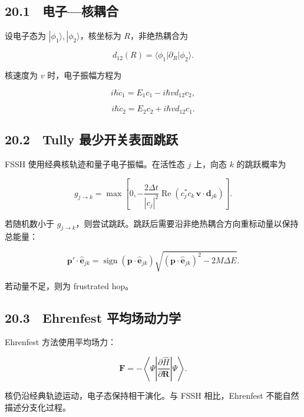 \documentclass[
  a4paper,
]{ctexbook}
\begin{document}
\hypertarget{ux7535ux5b50ux6838ux8026ux5408}{%
\subsection{20.1　电子---核耦合}\label{ux7535ux5b50ux6838ux8026ux5408}}

设电子态为 \(|\phi_1\rangle,|\phi_2\rangle\)，核坐标为
\(R\)，非绝热耦合为

\[
d_{12}(R)
=
\langle\phi_1|\partial_R|\phi_2\rangle.
\]

核速度为 \(v\) 时，电子振幅方程为

\[
i\hbar\dot c_1
=
E_1c_1
-
i\hbar v d_{12}c_2,
\]

\[
i\hbar\dot c_2
=
E_2c_2
+
i\hbar v d_{12}c_1.
\]

\hypertarget{tully-ux6700ux5c11ux5f00ux5173ux8868ux9762ux8df3ux8dc3}{%
\subsection{20.2　Tully
最少开关表面跳跃}\label{tully-ux6700ux5c11ux5f00ux5173ux8868ux9762ux8df3ux8dc3}}

FSSH 使用经典核轨迹和量子电子振幅。在活性态 \(j\) 上，向态 \(k\)
的跳跃概率为

\[
g_{j\rightarrow k}
=
\max
\left[
0,
-\frac{2\Delta t}{|c_j|^2}
\operatorname{Re}
\left(
c_j^{*}c_k\,\mathbf v\cdot\mathbf d_{jk}
\right)
\right].
\]

若随机数小于
\(g_{j\rightarrow k}\)，则尝试跳跃。跳跃后需要沿非绝热耦合方向重标动量以保持总能量：

\[
\mathbf p'\cdot\hat{\mathbf e}_{jk}
=
\operatorname{sign}
\left(
\mathbf p\cdot\hat{\mathbf e}_{jk}
\right)
\sqrt{
(\mathbf p\cdot\hat{\mathbf e}_{jk})^2
-
2M\Delta E
}.
\]

若动量不足，则为 frustrated hop。

\hypertarget{ehrenfest-ux5e73ux5747ux573aux52a8ux529bux5b66}{%
\subsection{20.3　Ehrenfest
平均场动力学}\label{ehrenfest-ux5e73ux5747ux573aux52a8ux529bux5b66}}

Ehrenfest 方法使用平均场力：

\[
\mathbf F
=
-\left\langle\Psi\left|\frac{\partial\hat H}{\partial\mathbf R}\right|\Psi\right\rangle.
\]

核仍沿经典轨迹运动，电子态保持相干演化。与 FSSH 相比，Ehrenfest
不能自然描述分支化过程。
\end{document}

